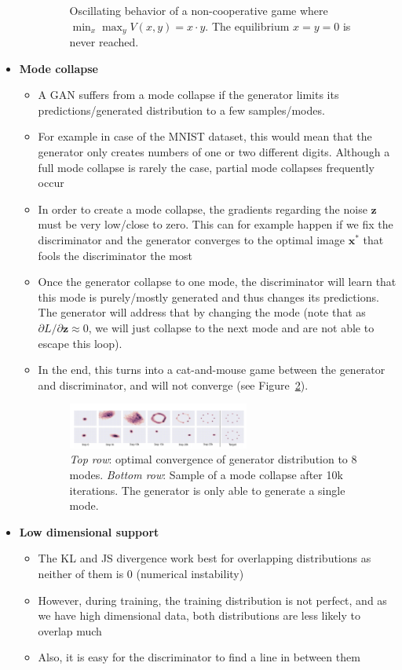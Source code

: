 \begin{itemize}
\begin{itemize}
\begin{figure}[ht!]
			\caption{Oscillating behavior of a non-cooperative game where $\min_x \max_y V(x,y) = x\cdot y$. The equilibrium $x=y=0$ is never reached.}
			\label{fig:GAN_reaching_equilibrium}
		\end{figure}
	\end{itemize}
	\item \textbf{Mode collapse}
	\begin{itemize}
		\item A GAN suffers from a mode collapse if the generator limits its predictions/generated distribution to a few samples/modes.
		\item For example in case of the MNIST dataset, this would mean that the generator only creates numbers of one or two different digits. Although a full mode collapse is rarely the case, partial mode collapses frequently occur
		\item In order to create a mode collapse, the gradients regarding the noise $\bm{z}$ must be very low/close to zero. This can for example happen if we fix the discriminator and the generator converges to the optimal image $\bm{x}^*$ that fools the discriminator the most
		\item Once the generator collapse to one mode, the discriminator will learn that this mode is purely/mostly generated and thus changes its predictions. The generator will address that by changing the mode (note that as $\partial L/\partial \bm{z}\approx 0$, we will just collapse to the next mode and are not able to escape this loop).
		\item In the end, this turns into a cat-and-mouse game between the generator and discriminator, and will not converge (see Figure~\ref{fig:GAN_mode_collapse}).
		\begin{figure}[ht!]
			\centering
			\includegraphics[width=0.6\textwidth]{figures/cv_deep_learning_GAN_mode_collapse.png}
			\caption{\textit{Top row}: optimal convergence of generator distribution to 8 modes. \textit{Bottom row}: Sample of a mode collapse after 10k iterations. The generator is only able to generate a single mode.}
			\label{fig:GAN_mode_collapse}
		\end{figure}
	\end{itemize}
	\item \textbf{Low dimensional support}
	\begin{itemize}
		\item The KL and JS divergence work best for overlapping distributions as neither of them is 0 (numerical instability)
		\item However, during training, the training distribution is not perfect, and as we have high dimensional data, both distributions are less likely to overlap much
		\item Also, it is easy for the discriminator to find a line in between them
	\end{itemize}
\end{itemize}
